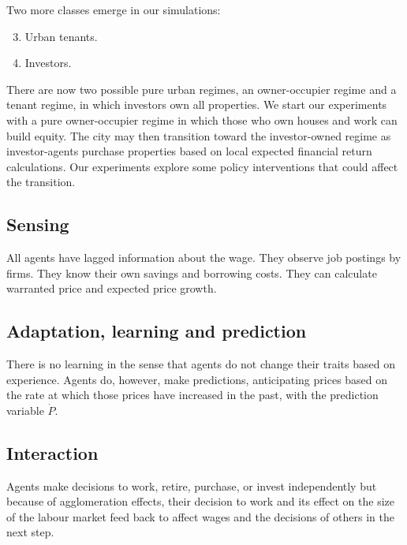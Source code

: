 Two more classes emerge in our simulations:
 \begin{enumerate}    \setcounter{enumi}{2}
    \item Urban tenants.
    \item Investors. 
\end{enumerate}
There are now two possible pure urban regimes, an owner-occupier regime and a tenant regime, in which investors own all properties. We start our experiments with a pure owner-occupier regime in which those who own houses and work can build equity.  The city may then transition toward the investor-owned regime as investor-agents purchase properties based on local expected financial return calculations. Our experiments explore some policy interventions that could affect the transition.






\subsection{Sensing}
All agents have lagged information about the wage. They observe job postings by firms. They know their own savings and borrowing costs. They can calculate  warranted price and expected price growth.%



\subsection{Adaptation, learning and prediction}
There is no learning in the sense that agents do not change their traits based on experience. Agents do, however, make predictions, anticipating prices based on the rate at which those prices have increased in the past, with the prediction variable $\dot P$.

\subsection{Interaction}
Agents make decisions to work, retire,  purchase, or invest independently but because of agglomeration effects, their decision to work and its effect on the size of the labour market feed back to affect wages and the decisions of others in the next step. 

